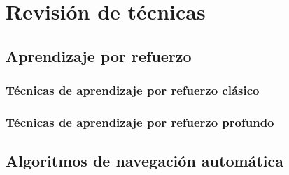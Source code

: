 \chapter{Revisión de técnicas}

\section{Aprendizaje por refuerzo}

\subsection{Técnicas de aprendizaje por refuerzo clásico}

\subsection{Técnicas de aprendizaje por refuerzo profundo}

\section{Algoritmos de navegación automática}